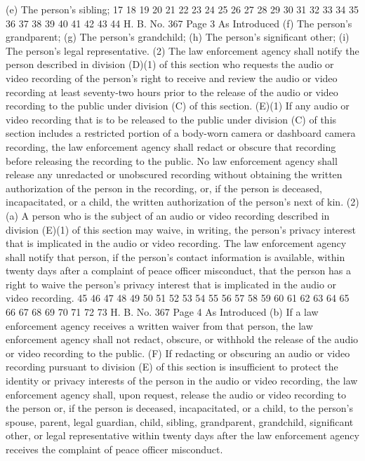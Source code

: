 (e) The person's sibling;
17
18
19
20
21
22
23
24
25
26
27
28
29
30
31
32
33
34
35
36
37
38
39
40
41
42
43
44
H. B. No. 367 Page 3
As Introduced
(f) The person's grandparent;
(g) The person's grandchild;
(h) The person's significant other;
(i) The person's legal representative.
(2) The law enforcement agency shall notify the person
described in division (D)(1) of this section who requests the
audio or video recording of the person's right to receive and
review the audio or video recording at least seventy-two hours
prior to the release of the audio or video recording to the
public under division (C) of this section.
(E)(1) If any audio or video recording that is to be
released to the public under division (C) of this section
includes a restricted portion of a body-worn camera or dashboard
camera recording, the law enforcement agency shall redact or
obscure that recording before releasing the recording to the
public. No law enforcement agency shall release any unredacted
or unobscured recording without obtaining the written
authorization of the person in the recording, or, if the person
is deceased, incapacitated, or a child, the written
authorization of the person's next of kin.
(2)(a) A person who is the subject of an audio or video
recording described in division (E)(1) of this section may
waive, in writing, the person's privacy interest that is
implicated in the audio or video recording. The law enforcement
agency shall notify that person, if the person's contact
information is available, within twenty days after a complaint
of peace officer misconduct, that the person has a right to
waive the person's privacy interest that is implicated in the
audio or video recording.
45
46
47
48
49
50
51
52
53
54
55
56
57
58
59
60
61
62
63
64
65
66
67
68
69
70
71
72
73
H. B. No. 367 Page 4
As Introduced
(b) If a law enforcement agency receives a written waiver
from that person, the law enforcement agency shall not redact,
obscure, or withhold the release of the audio or video recording
to the public.
(F) If redacting or obscuring an audio or video recording
pursuant to division (E) of this section is insufficient to
protect the identity or privacy interests of the person in the
audio or video recording, the law enforcement agency shall, upon
request, release the audio or video recording to the person or,
if the person is deceased, incapacitated, or a child, to the
person's spouse, parent, legal guardian, child, sibling,
grandparent, grandchild, significant other, or legal
representative within twenty days after the law enforcement
agency receives the complaint of peace officer misconduct.
